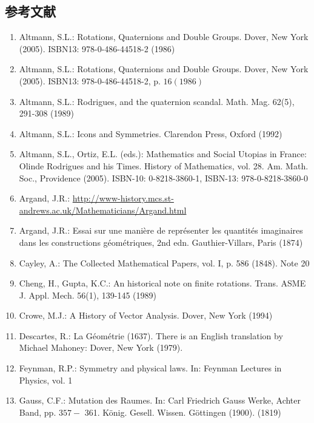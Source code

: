 
\begin{CJK}{UTF8}{gkai}
  \chapter{参考文献}
\end{CJK}
\begin{enumerate}
  \item Altmann, S.L.: Rotations, Quaternions and Double Groups. Dover, New York (2005). ISBN13: 978-0-486-44518-2 (1986)
  \item Altmann, S.L.: Rotations, Quaternions and Double Groups. Dover, New York (2005). ISBN13: 978-0-486-44518-2, p. $16(1986)$
  \item Altmann, S.L.: Rodrigues, and the quaternion scandal. Math. Mag. 62(5), 291-308 (1989)
  \item Altmann, S.L.: Icons and Symmetries. Clarendon Press, Oxford (1992)
  \item Altmann, S.L., Ortiz, E.L. (eds.): Mathematics and Social Utopias in France: Olinde Rodrigues and his Times. History of Mathematics, vol. 28. Am. Math. Soc., Providence (2005). ISBN-10: 0-8218-3860-1, ISBN-13: 978-0-8218-3860-0
  \item Argand, J.R.: \href{http://www-history.mcs.st-andrews.ac.uk/Mathematicians/Argand.html}{http://www-history.mcs.st-andrews.ac.uk/Mathematicians/Argand.html}
  \item Argand, J.R.: Essai sur une manière de représenter les quantités imaginaires dans les constructions géométriques, 2nd edn. Gauthier-Villars, Paris (1874)
  \item Cayley, A.: The Collected Mathematical Papers, vol. I, p. 586 (1848). Note 20
  \item Cheng, H., Gupta, K.C.: An historical note on finite rotations. Trans. ASME J. Appl. Mech. 56(1), 139-145 (1989)
  \item Crowe, M.J.: A History of Vector Analysis. Dover, New York (1994)

  \item Descartes, R.: La Géométrie (1637). There is an English translation by Michael Mahoney: Dover, New York (1979).

  \item Feynman, R.P.: Symmetry and physical laws. In: Feynman Lectures in Physics, vol. 1

  \item Gauss, C.F.: Mutation des Raumes. In: Carl Friedrich Gauss Werke, Achter Band, pp. $357-$ 361. König. Gesell. Wissen. Göttingen (1900). (1819)


\end{enumerate}
